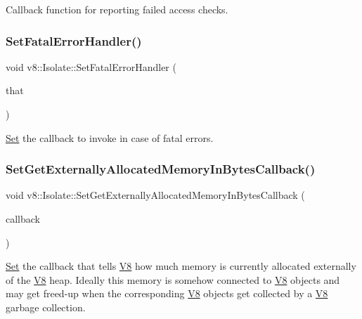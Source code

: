 Callback function for reporting failed access checks. \mbox{\label{classv8_1_1Isolate_a131f1e2e6a80618ac3c8c266a041851d}} 
\subsubsection{\texorpdfstring{Set\+Fatal\+Error\+Handler()}{SetFatalErrorHandler()}}
{\footnotesize\ttfamily void v8\+::\+Isolate\+::\+Set\+Fatal\+Error\+Handler (\begin{DoxyParamCaption}\item[{Fatal\+Error\+Callback}]{that }\end{DoxyParamCaption})}

\mbox{\hyperlink{classv8_1_1Set}{Set}} the callback to invoke in case of fatal errors. \mbox{\label{classv8_1_1Isolate_ae96487b4a06a7e0e2df8a2a906a248ad}} 
\subsubsection{\texorpdfstring{Set\+Get\+Externally\+Allocated\+Memory\+In\+Bytes\+Callback()}{SetGetExternallyAllocatedMemoryInBytesCallback()}}
{\footnotesize\ttfamily void v8\+::\+Isolate\+::\+Set\+Get\+Externally\+Allocated\+Memory\+In\+Bytes\+Callback (\begin{DoxyParamCaption}\item[{Get\+Externally\+Allocated\+Memory\+In\+Bytes\+Callback}]{callback }\end{DoxyParamCaption})}

\mbox{\hyperlink{classv8_1_1Set}{Set}} the callback that tells \mbox{\hyperlink{classv8_1_1V8}{V8}} how much memory is currently allocated externally of the \mbox{\hyperlink{classv8_1_1V8}{V8}} heap. Ideally this memory is somehow connected to \mbox{\hyperlink{classv8_1_1V8}{V8}} objects and may get freed-\/up when the corresponding \mbox{\hyperlink{classv8_1_1V8}{V8}} objects get collected by a \mbox{\hyperlink{classv8_1_1V8}{V8}} garbage collection. \mbox{\label{classv8_1_1Isolate_a64a3cec46b3d6a8f437da81ae1a61f84}} 
